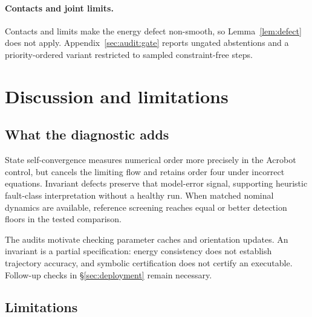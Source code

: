 \documentclass[10pt]{article}
\theoremstyle{definition}
\begin{document}
\paragraph{Contacts and joint limits.} Contacts and limits make the energy defect non-smooth, so Lemma~\ref{lem:defect} does not
apply. Appendix~\ref{sec:audit:gate} reports ungated abstentions and a
priority-ordered variant restricted to sampled constraint-free steps.

\section{Discussion and limitations}\label{sec:discussion}

\subsection{What the diagnostic adds}

State self-convergence measures numerical order more precisely in the Acrobot
control, but cancels the limiting flow and retains order four under incorrect
equations. Invariant defects preserve that model-error signal, supporting
heuristic fault-class interpretation without a healthy run. When matched
nominal dynamics are available, reference screening reaches equal or better
detection floors in the tested comparison.

The audits motivate checking parameter caches and orientation updates. An
invariant is a partial specification: energy consistency does not establish
trajectory accuracy, and symbolic certification does not certify an
executable. Follow-up checks in \S\ref{sec:deployment} remain necessary.

\subsection{Limitations}\label{sec:limits}
\end{document}
